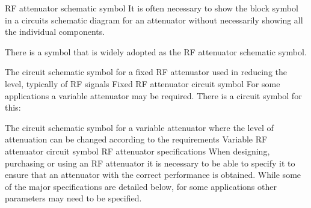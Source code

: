 RF attenuator schematic symbol
It is often necessary to show the block symbol in a circuits schematic diagram for an attenuator without necessarily showing all the individual components.

There is a symbol that is widely adopted as the RF attenuator schematic symbol.

The circuit schematic symbol for a fixed RF  attenuator used in reducing the level, typically of RF signals
Fixed RF attenuator circuit symbol
For some applications a variable attenuator may be required. There is a circuit symbol for this:

The circuit schematic symbol for a variable attenuator where the level of attenuation can be changed according to the requirements
Variable RF attenuator circuit symbol
RF attenuator specifications
When designing, purchasing or using an RF attenuator it is necessary to be able to specify it to ensure that an attenuator with the correct performance is obtained. While some of the major specifications are detailed below, for some applications other parameters may need to be specified.

